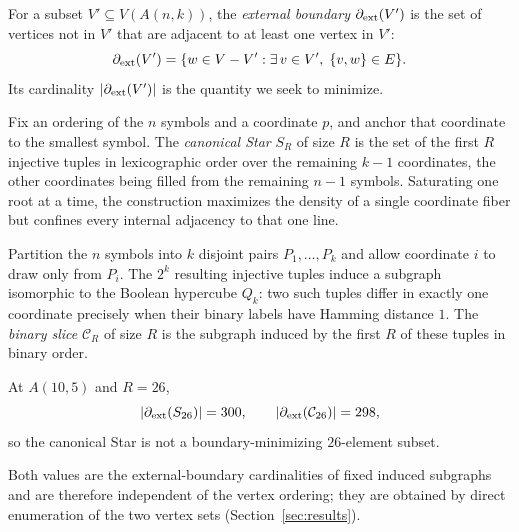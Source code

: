 \begin{definition}
For a subset $V' \subseteq V(A(n,k))$, the \emph{external boundary} $\partial_{\mathrm{ext}}(V')$
is the set of vertices not in $V'$ that are adjacent to at least one vertex in
$V'$:
	\begin{equation}\label{eq:ext-boundary}
		\partial_{\mathrm{ext}}(V') = \{ w \in V  -  V' : \exists\, v \in V',\; \{v,w\} \in E \}.
	\end{equation}
	Its cardinality $|\partial_{\mathrm{ext}}(V')|$ is the quantity we seek to minimize.
\end{definition}

\begin{definition}\label{def:star}
Fix an ordering of the $n$ symbols and a coordinate $p$, and anchor that
coordinate to the smallest symbol.  The \emph{canonical Star} $S_R$ of size $R$
is the set of the first $R$ injective tuples in lexicographic order over the
remaining $k-1$ coordinates, the other coordinates being filled from the
remaining $n-1$ symbols.  Saturating one root at a time, the construction
maximizes the density of a single coordinate fiber but confines every internal
adjacency to that one line.
\end{definition}

\begin{definition}\label{def:slice}
Partition the $n$ symbols into $k$ disjoint pairs $P_1,\dots,P_k$ and allow
coordinate $i$ to draw only from $P_i$.  The $2^k$ resulting injective tuples
induce a subgraph isomorphic to the Boolean hypercube $Q_k$: two such tuples
differ in exactly one coordinate precisely when their binary labels have
Hamming distance $1$.  The \emph{binary slice} $\mathcal{C}_R$ of size $R$ is
the subgraph induced by the first $R$ of these tuples in binary order.
\end{definition}

\begin{proposition}\label{prop:crossover}
At $A(10,5)$ and $R = 26$,
\[
	|\partial_{\mathrm{ext}}(S_{26})| = 300{}, \qquad
	|\partial_{\mathrm{ext}}(\mathcal{C}_{26})| = 298{},
\]
so the canonical Star is not a boundary-minimizing $26$-element subset.
\end{proposition}

Both values are the external-boundary cardinalities of fixed induced subgraphs
and are therefore independent of the vertex ordering; they are obtained by
direct enumeration of the two vertex sets (Section~\ref{sec:results}).


